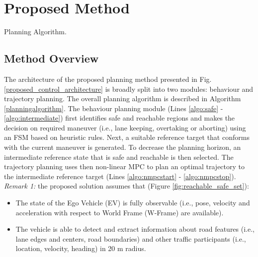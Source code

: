 \documentclass[letterpaper, 10 pt, conference]{ieeeconf}
\begin{document}
\section{Proposed Method}
\label{section:proposedmethod}

    \begin{algorithm}[!t]
    \small
    \DontPrintSemicolon
    \caption{Planning Algorithm. \label{planningalgorithm}}
\end{algorithm}

\subsection{Method Overview}
The architecture of the proposed planning method presented in Fig. \ref{proposed_control_architecture} is broadly split into two modules: behaviour and trajectory planning. 
The overall planning algorithm is described in Algorithm \ref{planningalgorithm}. 
The behaviour planning module (Lines \ref{algo:safe} - \ref{algo:intermediate}) first identifies safe and reachable regions and makes the decision on required maneuver (i.e., lane keeping, overtaking or aborting) using an FSM based on heuristic rules. 
Next, a suitable reference target that conforms with the current maneuver is generated. 
To decrease the planning horizon, an intermediate reference state that is safe and reachable is then selected. The trajectory planning uses then non-linear MPC to plan an optimal trajectory to the intermediate reference target (Lines \ref{algo:nmpcstart} - \ref{algo:nmpcstop}). \\
\textit{Remark 1:} the proposed solution assumes that (Figure \ref{fig:reachable_safe_set}):
\begin{itemize}
    \item The state of the Ego Vehicle (EV) is fully observable (i.e., pose, velocity and acceleration with respect to World Frame (W-Frame) are available).
	\item The vehicle is able to detect and extract information about road features (i.e., lane edges and centers, road boundaries) and other traffic participants (i.e., location, velocity, heading) in 20 m radius.
\end{itemize}
\end{document}
